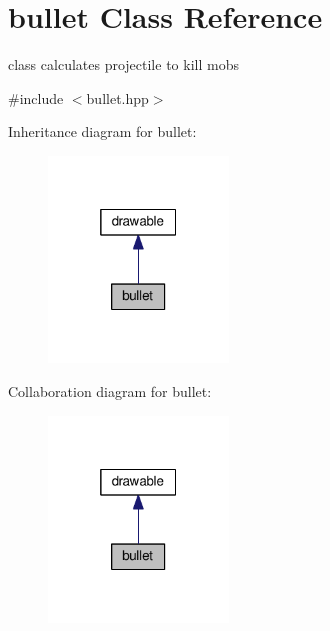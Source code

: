 \hypertarget{classbullet}{}\section{bullet Class Reference}
\label{classbullet}


class calculates projectile to kill mobs  




{\ttfamily \#include $<$bullet.\+hpp$>$}



Inheritance diagram for bullet\+:\nopagebreak
\begin{figure}[H]
\begin{center}
\leavevmode
\includegraphics[width=136pt]{classbullet__inherit__graph}
\end{center}
\end{figure}


Collaboration diagram for bullet\+:
\nopagebreak
\begin{figure}[H]
\begin{center}
\leavevmode
\includegraphics[width=136pt]{classbullet__coll__graph}
\end{center}
\end{figure}
